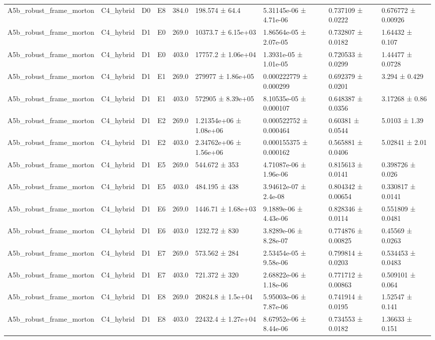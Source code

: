 \begin{table}
\begin{tabular}{lllllllll}
A5b\_robust\_frame\_morton & C4\_hybrid & D0 & E8 & 384.0 & 198.574 ± 64.4 & 5.31145e-06 ± 4.71e-06 & 0.737109 ± 0.0222 & 0.676772 ± 0.00926 \\
A5b\_robust\_frame\_morton & C4\_hybrid & D1 & E0 & 269.0 & 10373.7 ± 6.15e+03 & 1.86564e-05 ± 2.07e-05 & 0.732807 ± 0.0182 & 1.64432 ± 0.107 \\
A5b\_robust\_frame\_morton & C4\_hybrid & D1 & E0 & 403.0 & 17757.2 ± 1.06e+04 & 1.3931e-05 ± 1.01e-05 & 0.720533 ± 0.0299 & 1.44477 ± 0.0728 \\
A5b\_robust\_frame\_morton & C4\_hybrid & D1 & E1 & 269.0 & 279977 ± 1.86e+05 & 0.000222779 ± 0.000299 & 0.692379 ± 0.0201 & 3.294 ± 0.429 \\
A5b\_robust\_frame\_morton & C4\_hybrid & D1 & E1 & 403.0 & 572905 ± 8.39e+05 & 8.10535e-05 ± 0.000107 & 0.648387 ± 0.0356 & 3.17268 ± 0.86 \\
A5b\_robust\_frame\_morton & C4\_hybrid & D1 & E2 & 269.0 & 1.21354e+06 ± 1.08e+06 & 0.000522752 ± 0.000464 & 0.60381 ± 0.0544 & 5.0103 ± 1.39 \\
A5b\_robust\_frame\_morton & C4\_hybrid & D1 & E2 & 403.0 & 2.34762e+06 ± 1.56e+06 & 0.000155375 ± 0.000162 & 0.565881 ± 0.0406 & 5.02841 ± 2.01 \\
A5b\_robust\_frame\_morton & C4\_hybrid & D1 & E5 & 269.0 & 544.672 ± 353 & 4.71087e-06 ± 1.96e-06 & 0.815613 ± 0.0141 & 0.398726 ± 0.026 \\
A5b\_robust\_frame\_morton & C4\_hybrid & D1 & E5 & 403.0 & 484.195 ± 438 & 3.94612e-07 ± 2.4e-08 & 0.804342 ± 0.00654 & 0.330817 ± 0.0141 \\
A5b\_robust\_frame\_morton & C4\_hybrid & D1 & E6 & 269.0 & 1446.71 ± 1.68e+03 & 9.1889e-06 ± 4.43e-06 & 0.828346 ± 0.0114 & 0.551809 ± 0.0481 \\
A5b\_robust\_frame\_morton & C4\_hybrid & D1 & E6 & 403.0 & 1232.72 ± 830 & 3.8289e-06 ± 8.28e-07 & 0.774876 ± 0.00825 & 0.45569 ± 0.0263 \\
A5b\_robust\_frame\_morton & C4\_hybrid & D1 & E7 & 269.0 & 573.562 ± 284 & 2.53454e-05 ± 9.58e-06 & 0.799814 ± 0.0203 & 0.534453 ± 0.0483 \\
A5b\_robust\_frame\_morton & C4\_hybrid & D1 & E7 & 403.0 & 721.372 ± 320 & 2.68822e-06 ± 1.18e-06 & 0.771712 ± 0.00863 & 0.509101 ± 0.064 \\
A5b\_robust\_frame\_morton & C4\_hybrid & D1 & E8 & 269.0 & 20824.8 ± 1.5e+04 & 5.95003e-06 ± 7.87e-06 & 0.741914 ± 0.0195 & 1.52547 ± 0.141 \\
A5b\_robust\_frame\_morton & C4\_hybrid & D1 & E8 & 403.0 & 22432.4 ± 1.27e+04 & 8.67952e-06 ± 8.44e-06 & 0.734553 ± 0.0182 & 1.36633 ± 0.151 \\

\end{tabular}
\end{table}
